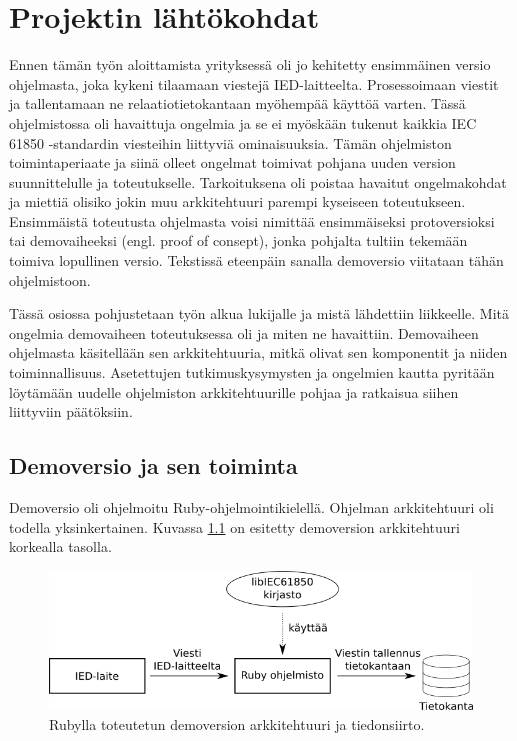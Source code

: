 \chapter{Projektin lähtökohdat}
\label{ch:projektin-lähtökohdat}
Ennen tämän työn aloittamista yrityksessä oli jo kehitetty ensimmäinen versio ohjelmasta, joka kykeni tilaamaan viestejä IED-laitteelta. Prosessoimaan viestit ja tallentamaan ne relaatiotietokantaan myöhempää käyttöä varten. Tässä ohjelmistossa oli havaittuja ongelmia ja se ei myöskään tukenut kaikkia IEC 61850 -standardin viesteihin liittyviä ominaisuuksia. Tämän ohjelmiston toimintaperiaate ja siinä olleet ongelmat toimivat pohjana uuden version suunnittelulle ja toteutukselle. Tarkoituksena oli poistaa havaitut ongelmakohdat ja miettiä olisiko jokin muu arkkitehtuuri parempi kyseiseen toteutukseen. Ensimmäistä toteutusta ohjelmasta voisi nimittää ensimmäiseksi protoversioksi tai demovaiheeksi (engl. proof of consept), jonka pohjalta tultiin tekemään toimiva lopullinen versio. Tekstissä eteenpäin sanalla demoversio viitataan tähän ohjelmistoon.

Tässä osiossa pohjustetaan työn alkua lukijalle ja mistä lähdettiin liikkeelle. Mitä ongelmia demovaiheen toteutuksessa oli ja miten ne havaittiin. Demovaiheen ohjelmasta käsitellään sen arkkitehtuuria, mitkä olivat sen komponentit ja niiden toiminnallisuus. Asetettujen tutkimuskysymysten ja ongelmien kautta pyritään löytämään uudelle ohjelmiston arkkitehtuurille pohjaa ja ratkaisua siihen liittyviin päätöksiin.


\section{Demoversio ja sen toiminta}
Demoversio oli ohjelmoitu Ruby-ohjelmointikielellä. Ohjelman arkkitehtuuri oli todella yksinkertainen. Kuvassa \ref{fig:demo-architecture} on esitetty demoversion arkkitehtuuri korkealla tasolla.

\begin{figure}
	\includegraphics[width=1\textwidth]{pictures/demo-architecture.png}
	\caption{Rubylla toteutetun demoversion arkkitehtuuri ja tiedonsiirto.}
	\label{fig:demo-architecture}
\end{figure}

